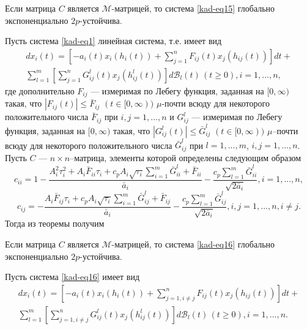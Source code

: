 \begin{corollary}\label{kad-col2}
Если матрица $C$
является $\mathcal{M}$-матрицей, то система \eqref{kad-eq15} глобально
экспоненциально $2p$-устойчива.
\end{corollary}
Пусть система \eqref{kad-eq1} линейная система, т.е. имеет вид
\begin{equation}\label{kad-eq16}
\begin{array}{crl}
dx_i(t) = \left [-a_i(t)x_i(h_i(t))+ \sum
\limits_{j=1}^nF_{ij}(t)x_j(h_{ij}(t))\right]dt +\\
 \sum \limits_{l=1}^m \left [\sum
\limits_{j=1}^nG^l_{ij}(t)x_j(h^l_{ij}(t))\right ]d\mathcal B_l(t)
\, (t \ge 0), i = 1,...,n,
\end{array}
\end{equation}
где дополнительно $F_{ij}$ --- измеримая по Лебегу функция, заданная
на $[0, \infty)$ такая, что $|F_{ij}(t)| \leq \bar F_{ij} {\,} {\,}
(t \in [0, \infty))$ $\mu $-почти всюду для некоторого
положительного числа $\bar F_{ij}$ при $i,j = 1,...,n$ и $G^l_{ij}$
--- измеримая по Лебегу функция, заданная на $[0, \infty)$ такая, что
$|G^l_{ij}(t)| \leq \bar G^l_{ij} {\,} {\,} (t \in [0, \infty))$
$\mu $--почти всюду для некоторого положительного числа $\bar
G^l_{ij}$ при $l = 1,...,m$, $i,j = 1,...,n$.
Пусть $C$ --- $n\times n$--матрица, элементы которой определены
следующим образом
$$
c_{ii} = 1 - \frac{A_i^2\tau _i^2 + A_i\bar F_{ii}\tau _i  + c_p A_i
\sqrt{\tau _i}\sum \limits _{i=1}^m\bar G^l_{ii} + \bar F_{ii}}{\bar
a_i} - \frac{c_p\sum \limits _{l=1}^m \bar G^l_{ii}}{\sqrt{2\bar
a_i}}, i = 1,...,n,
$$
$$
c_{ij} = - \frac{A_i\bar F_{ij}\tau _i + c_p A_i \sqrt{\tau _i}\sum
\limits _{i=1}^m\bar G^l_{ij} + \bar F_{ij}}{\bar a_i} -
\frac{c_p\sum \limits _{l=1}^m \bar G^l_{ij}}{\sqrt{2\bar a_i}}, i,j
= 1,...,n, i\neq j.
$$
Тогда из теоремы получим
\begin{corollary}\label{kad-col3}
Если матрица $C$ является $\mathcal
M$-матрицей, то система \eqref{kad-eq16} глобально экспоненциально
$2p$-устойчива.
\end{corollary}
Пусть система \eqref{kad-eq16} имеет вид
\begin{equation}\label{kad-eq17}
\begin{array}{crl}
dx_i(t) = \left [-a_i(t)x_i(h_i(t))+ \sum
\limits_{j=1, i\neq j}^nF_{ij}(t)x_j(h_{ij}(t))\right]dt +\\
 \sum \limits_{l=1}^m \left [\sum
\limits_{j=1, i\neq j}^nG^l_{ij}(t)x_j(h^l_{ij}(t))\right ]d\mathcal
B_l(t) \, (t \ge 0), i = 1,...,n.
\end{array}
\end{equation}

